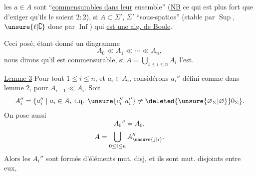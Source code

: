 
les $a\in A$ sont ``\uline{commensurables dans leur} ensemble'' (\uline{NB} ce qui est plus fort que d'exiger qu'ils le soient $2:2$), si $A\subset\Sigma'$, $\Sigma'$   ``sous-spatios'' (stable par $\operatorname{Sup}$, $\unsure{\ell|\complement}$ donc par $\operatorname{Inf}$) qui \uline{est une alg. de Boole}.

Ceci posé, étant donné un diagramme
\[
A_0\ll A_1\ll\cdots\ll A_n,
\]
nous dirons qu'il est commensurable, si $A=\bigcup_{1\leq i\leq n}A_i$ l'est.


\uline{Lemme 3} Pour tout $1\leq i\leq n$, et $a_i\in A_i$, considérons $a_i''$ défini comme dans lemme 2, pour $A_{i-1}\ll A_i$. Soit
\[
A_i''=\{a_i''\mid a_i\in A_i\text{ t.q. }\unsure{c_i''|a_i''}\ne\deleted{\unsure{\varnothing_\Sigma|\varnothing}}0_\Sigma\}.
\]
 On pose aussi
\[
A_0''=A_0,
\]
\[
A=\bigcup_{0\leq i\leq n}A_{\unsure{j|i}}''.
\]
Alors les $A_i''$ sont formés d'éléments  mut. disj, et ils sont mut. disjoints entre eux,
